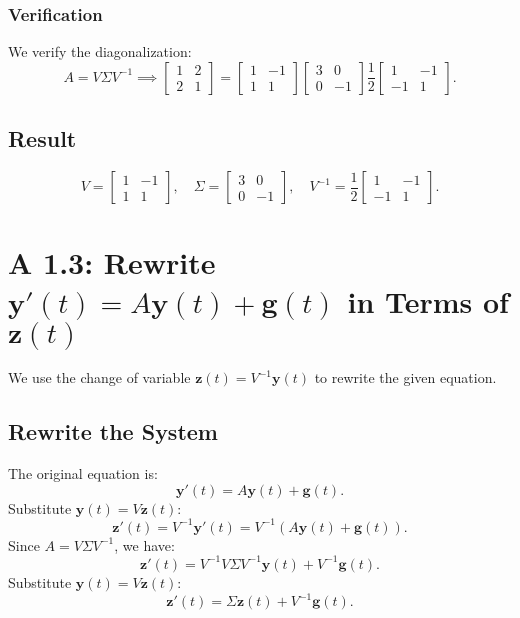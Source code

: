 \documentclass[12pt]{article}
\begin{document}
\subsubsection*{Verification}
We verify the diagonalization:
\[
A = V\Sigma V^{-1} \implies \begin{bmatrix} 1 & 2 \\ 2 & 1 \end{bmatrix} = \begin{bmatrix} 1 & -1 \\ 1 & 1 \end{bmatrix}\begin{bmatrix} 3 & 0 \\ 0 & -1 \end{bmatrix}\frac{1}{2}\begin{bmatrix} 1 & -1 \\ -1 & 1 \end{bmatrix}.
\]

\subsection*{Result}
\[
V = \begin{bmatrix} 1 & -1 \\ 1 & 1 \end{bmatrix}, \quad \Sigma = \begin{bmatrix} 3 & 0 \\ 0 & -1 \end{bmatrix}, \quad V^{-1} = \frac{1}{2}\begin{bmatrix} 1 & -1 \\ -1 & 1 \end{bmatrix}.
\]

\section*{A 1.3: Rewrite \(\mathbf{y}'(t) = A\mathbf{y}(t) + \mathbf{g}(t)\) in Terms of \(\mathbf{z}(t)\)}
We use the change of variable \(\mathbf{z}(t) = V^{-1}\mathbf{y}(t)\) to rewrite the given equation.

\subsection*{Rewrite the System}
The original equation is:
\[
\mathbf{y}'(t) = A\mathbf{y}(t) + \mathbf{g}(t).
\]
Substitute \(\mathbf{y}(t) = V\mathbf{z}(t)\):
\[
\mathbf{z}'(t) = V^{-1}\mathbf{y}'(t) = V^{-1}\left(A\mathbf{y}(t) + \mathbf{g}(t)\right).
\]
Since \( A = V\Sigma V^{-1} \), we have:
\[
\mathbf{z}'(t) = V^{-1}V\Sigma V^{-1}\mathbf{y}(t) + V^{-1}\mathbf{g}(t).
\]
Substitute \(\mathbf{y}(t) = V\mathbf{z}(t)\):
\[
\mathbf{z}'(t) = \Sigma\mathbf{z}(t) + V^{-1}\mathbf{g}(t).
\]
\end{document}
